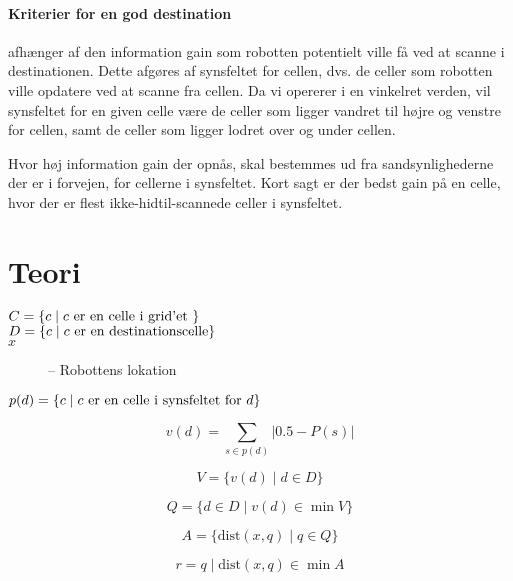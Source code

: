 \paragraph{Kriterier for en god destination} afhænger af den information gain som robotten potentielt ville få ved at scanne i destinationen.
Dette afgøres af synsfeltet for cellen, dvs. de celler som robotten ville opdatere ved at scanne fra cellen.
Da vi opererer i en vinkelret verden, vil synsfeltet for en given celle være de celler som ligger vandret til højre og venstre for cellen, samt de celler som ligger lodret over og under cellen.

Hvor høj information gain der opnås, skal bestemmes ud fra sandsynlighederne der er i forvejen, for cellerne i synsfeltet.
Kort sagt er der bedst gain på en celle, hvor der er flest ikke-hidtil-scannede celler i synsfeltet.

\section{Teori}
\begin{description}
\item[$C = \{ c \mid c \textnormal{ er en celle i grid'et } \}$]{}
\item[$D = \{ c \mid c \textnormal{ er en destinationscelle}\}$]{}
\item[$x$]{-- Robottens lokation}
\item[$p(d) = \{ c \mid c \textnormal{ er en celle i synsfeltet for } d \}$]{}
\end{description}

\begin{equation}
v(d) = \sum_{s \in p(d)} |0.5 - P(s)|
\end{equation}

\begin{equation}
V = \{ v(d) \mid d \in D \}
\end{equation}

\begin{equation}
Q = \{ d \in D \mid v(d) \in \min V \}
\end{equation}

\begin{equation}
A = \{ \text{dist}(x,q) \mid q \in Q \}
\end{equation}

\begin{equation}
r =  q \mid \text{dist}(x,q) \in \min A
\end{equation}

